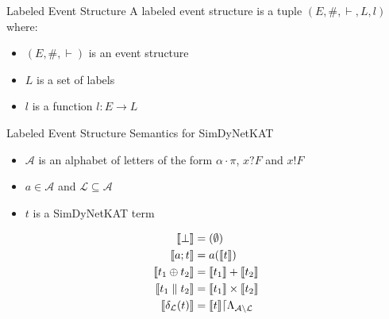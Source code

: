 \begin{frame}{Labeled Event Structure}
    A labeled event structure is a tuple $(E,\#,\vdash,L,l)$
    where:
    \begin{itemize}
        \item $(E,\#,\vdash)$ is an event structure
        \item $L$ is a set of labels
        \item $l$ is a function $l : E \rightarrow L$
    \end{itemize}
\end{frame}

\begin{frame}{Labeled Event Structure Semantics for SimDyNetKAT}
    \begin{itemize}
        \item $\mathcal{A}$ is an alphabet of letters of the form
              $\alpha\cdot\pi$, $x?F$ and $x!F$
        \item $a \in \mathcal{A}$ and $\mathcal{L} \subseteq \mathcal{A}$
        \item $t$ is a SimDyNetKAT term
    \end{itemize}
    \begin{align*}
        \llbracket \bot \rrbracket              & = (\emptyset)                                \\
        \llbracket a;t \rrbracket               & = a(\llbracket t \rrbracket)                          \\
        \llbracket t_1 \oplus t_2 \rrbracket    & = \llbracket t_1 \rrbracket + \llbracket t_2 \rrbracket               \\
        \llbracket t_1 \parallel t_2 \rrbracket & = \llbracket t_1 \rrbracket \times \llbracket t_2 \rrbracket          \\
        \llbracket \delta_{\mathcal{L}}(t) \rrbracket
                                & = \llbracket t \rrbracket\lceil 
                                \Lambda_{ \mathcal{A} \setminus \mathcal{L}}
    \end{align*}

\end{frame}

